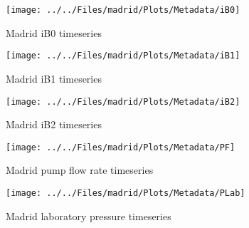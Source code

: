 
    \begin{figure}
        \centering
\texttt{[image: ../../Files/madrid/Plots/Metadata/iB0]}
    \caption{Madrid iB0 timeseries}
            \label{fig:iB0}
    \end{figure}

    \begin{figure}
        \centering
\texttt{[image: ../../Files/madrid/Plots/Metadata/iB1]}
    \caption{Madrid iB1 timeseries}
            \label{fig:iB1}
    \end{figure}

    \begin{figure}
        \centering
\texttt{[image: ../../Files/madrid/Plots/Metadata/iB2]}
    \caption{Madrid iB2 timeseries}
            \label{fig:iB2}
    \end{figure}

    \begin{figure}
        \centering
\texttt{[image: ../../Files/madrid/Plots/Metadata/PF]}
    \caption{Madrid pump flow rate timeseries}
            \label{fig:PF}
    \end{figure}

       \begin{figure}
        \centering
\texttt{[image: ../../Files/madrid/Plots/Metadata/PLab]}
    \caption{Madrid laboratory pressure timeseries}
            \label{fig:PLab}
    \end{figure}

